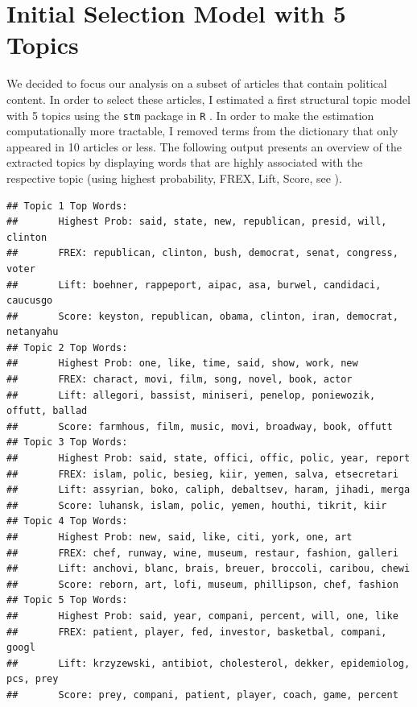 \documentclass[12pt]{article}\usepackage[]{graphicx}\usepackage[]{color}
\makeatletter
\newenvironment{kframe}{%
 \def\at@end@of@kframe{}%
 \ifinner\ifhmode%
  \def\at@end@of@kframe{\end{minipage}}%
  \begin{minipage}{\columnwidth}%
 \fi\fi%
 \def\FrameCommand##1{\hskip\@totalleftmargin \hskip-\fboxsep
 \colorbox{shadecolor}{##1}\hskip-\fboxsep
     \hskip-\linewidth \hskip-\@totalleftmargin \hskip\columnwidth}%
 \MakeFramed {\advance\hsize-\width
   \@totalleftmargin\z@ \linewidth\hsize
   \@setminipage}}%
 {\par\unskip\endMakeFramed%
 \at@end@of@kframe}
\newenvironment{knitrout}{}{} %
\makeatother
\begin{document}
\section{Initial Selection Model with 5 Topics}

We decided to focus our analysis on a subset of articles that contain political content. In order to select these articles, I estimated a first structural topic model with 5 topics using the \texttt{stm} package in \texttt{R} \citep[using spectral initialization, see][]{roberts2014structural,roberts2014stm}. In order to make the estimation computationally more tractable, I removed terms from the dictionary that only appeared in 10 articles or less. The following output presents an overview of the extracted topics by displaying words that are highly associated with the respective topic (using highest probability, FREX, Lift, Score, see \citealt{roberts2014stm}).

\begin{knitrout}
\color{fgcolor}\begin{kframe}
\begin{verbatim}
## Topic 1 Top Words:
##  	 Highest Prob: said, state, new, republican, presid, will, clinton 
##  	 FREX: republican, clinton, bush, democrat, senat, congress, voter 
##  	 Lift: boehner, rappeport, aipac, asa, burwel, candidaci, caucusgo 
##  	 Score: keyston, republican, obama, clinton, iran, democrat, netanyahu 
## Topic 2 Top Words:
##  	 Highest Prob: one, like, time, said, show, work, new 
##  	 FREX: charact, movi, film, song, novel, book, actor 
##  	 Lift: allegori, bassist, miniseri, penelop, poniewozik, offutt, ballad 
##  	 Score: farmhous, film, music, movi, broadway, book, offutt 
## Topic 3 Top Words:
##  	 Highest Prob: said, state, offici, offic, polic, year, report 
##  	 FREX: islam, polic, besieg, kiir, yemen, salva, etsecretari 
##  	 Lift: assyrian, boko, caliph, debaltsev, haram, jihadi, merga 
##  	 Score: luhansk, islam, polic, yemen, houthi, tikrit, kiir 
## Topic 4 Top Words:
##  	 Highest Prob: new, said, like, citi, york, one, art 
##  	 FREX: chef, runway, wine, museum, restaur, fashion, galleri 
##  	 Lift: anchovi, blanc, brais, breuer, broccoli, caribou, chewi 
##  	 Score: reborn, art, lofi, museum, phillipson, chef, fashion 
## Topic 5 Top Words:
##  	 Highest Prob: said, year, compani, percent, will, one, like 
##  	 FREX: patient, player, fed, investor, basketbal, compani, googl 
##  	 Lift: krzyzewski, antibiot, cholesterol, dekker, epidemiolog, pcs, prey 
##  	 Score: prey, compani, patient, player, coach, game, percent
\end{verbatim}
\end{kframe}
\end{knitrout}
\end{document}
